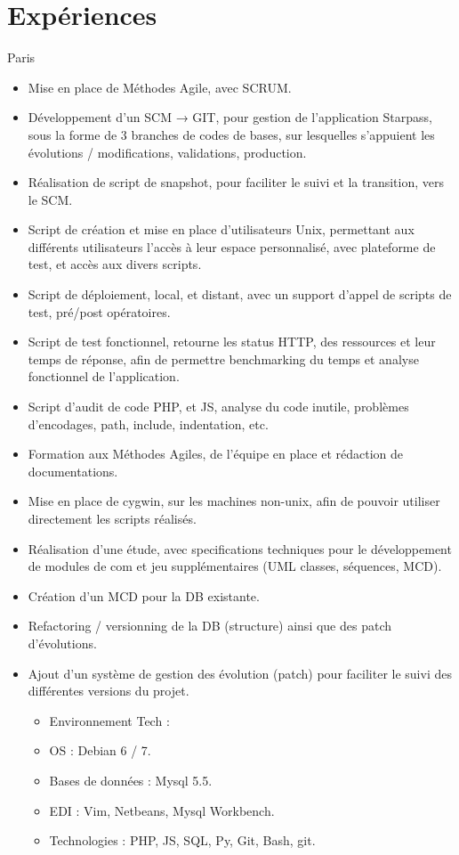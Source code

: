 \documentclass[10pt,a4paper,sans]{moderncv}
\begin{document}
\section{Expériences}
{Paris}{}{
    \begin{itemize}%
        \item Mise en place de Méthodes Agile, avec SCRUM.
        \item Développement d'un SCM → GIT, pour gestion de l'application Starpass, sous la forme de 3 branches de codes de bases, sur lesquelles s'appuient les évolutions / modifications, validations, production.
        \item Réalisation de script de snapshot, pour faciliter le suivi et la transition, vers le SCM.
        \item Script de création et mise en place d'utilisateurs Unix, permettant aux différents utilisateurs l'accès à leur espace personnalisé, avec plateforme de test, et accès aux divers scripts.
        \item Script de déploiement, local, et distant, avec un support d'appel de scripts de test, pré/post opératoires.
        \item Script de test fonctionnel, retourne les status HTTP, des ressources et leur temps de réponse, afin de permettre benchmarking du temps et analyse fonctionnel de l'application.
        \item Script d'audit de code PHP, et JS, analyse du code inutile, problèmes d'encodages, path, include, indentation, etc.
        \item Formation aux Méthodes Agiles, de l'équipe en place et rédaction de documentations.
        \item Mise en place de cygwin, sur les machines non-unix, afin de pouvoir utiliser directement les scripts réalisés.
        \item Réalisation d'une étude, avec specifications techniques pour le développement de modules de com et jeu supplémentaires (UML classes, séquences, MCD).
        \item Création d'un MCD pour la DB existante.
        \item Refactoring / versionning de la DB (structure) ainsi que des patch d'évolutions.
        \item Ajout d'un système de gestion des évolution (patch) pour faciliter le suivi des différentes versions du projet.
            \begin{itemize}%
                \item Environnement Tech :
                \item OS : Debian 6 / 7.
                \item Bases de données : Mysql 5.5.
                \item EDI : Vim, Netbeans, Mysql Workbench.
                \item Technologies : PHP, JS, SQL, Py, Git, Bash, git.
            \end{itemize}
\end{itemize}}
\end{document}
